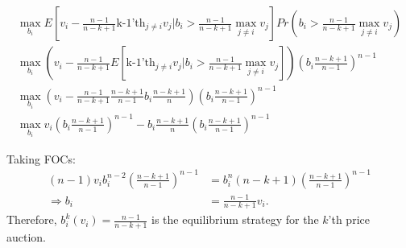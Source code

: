 \documentclass[11pt]{article} %
\begin{document}
\begin{align*}
\max_{b_i}E[v_i - \frac{n-1}{n-k+1}\text{k-1'th}_{j \neq i}v_j|b_i>\frac{n-1}{n-k+1}\max_{j\neq i} v_j]Pr(b_i>\frac{n-1}{n-k+1}\max_{j\neq i} v_j)  \\ %
\max_{b_i}(v_i - \frac{n-1}{n-k+1}E[\text{k-1'th}_{j \neq i}v_j|b_i>\frac{n-1}{n-k+1}\max_{j\neq i} v_j])\left(b_i\frac{n-k+1}{n-1}\right)^{n-1} \\
\max_{b_i}(v_i - \frac{n-1}{n-k+1}\frac{n-k+1}{n-1} b_i \frac{n-k+1}{n})\left(b_i\frac{n-k+1}{n-1}\right)^{n-1}\\
\max_{b_i}v_i\left(b_i\frac{n-k+1}{n-1}\right)^{n-1} -  b_i \frac{n-k+1}{n}\left(b_i\frac{n-k+1}{n-1}\right)^{n-1}
\end{align*}

Taking FOCs:
\begin{align*}
(n-1)v_ib_i^{n-2}\left(\frac{n-k+1}{n-1}\right)^{n-1} &= b_i^n (n-k+1)\left(\frac{n-k+1}{n-1}\right)^{n-1}\\
\Rightarrow b_i &=\frac{n-1}{n-k+1}v_i .
\end{align*}
Therefore, $b^k_i(v_i) = \frac{n-1}{n-k+1}$ is the equilibrium strategy for the $k$'th price auction.
\end{document}
